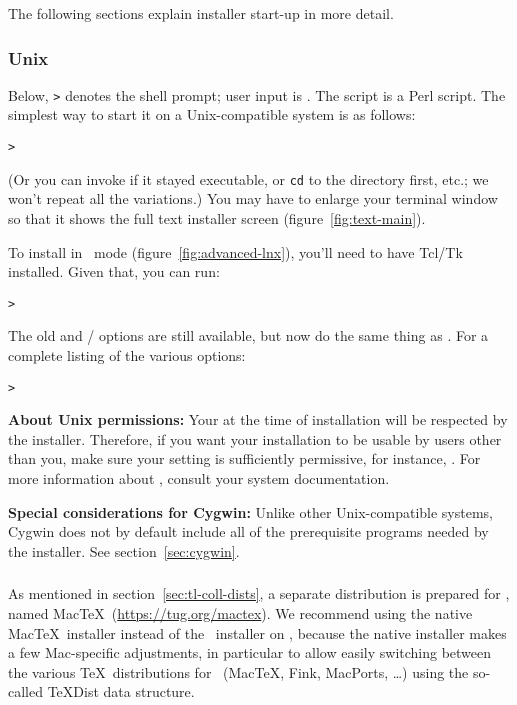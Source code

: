 \documentclass{article}
\begin{document}
The following sections explain installer start-up in more detail.

\subsubsection{Unix}

Below, \texttt{>} denotes the shell prompt; user input is
.
The script  is a Perl script.  The simplest way
to start it on a Unix-compatible system is as follows:
\begin{alltt}
> 
\end{alltt}
(Or you can invoke  if it stayed
executable, or \texttt{cd} to the directory first, etc.; we won't repeat
all the variations.)  You may have to enlarge your terminal window so
that it shows the full text installer screen
(figure~\ref{fig:text-main}).

To install in \GUI\ mode (figure~\ref{fig:advanced-lnx}), you'll need to
have Tcl/Tk installed.  Given that, you can run:
\begin{alltt}
> 
\end{alltt}

The old  and / options are
still available, but now do the same thing as . For
a complete listing of the various options:
\begin{alltt}
> 
\end{alltt}

\textbf{About Unix permissions:} Your  at the time
of installation will be respected by the \TL{} installer.  Therefore, if
you want your installation to be usable by users other than you, make
sure your setting is sufficiently permissive, for instance, .  For more information about , consult your system
documentation.

\textbf{Special considerations for Cygwin:} Unlike other
Unix-compatible systems, Cygwin does not by default include all of the
prerequisite programs needed by the \TL{} installer.  See
section~\ref{sec:cygwin}.


\subsubsection{\MacOSX}
\label{sec:macosx}

As mentioned in section~\ref{sec:tl-coll-dists}, a separate distribution
is prepared for \MacOSX, named Mac\TeX\ (\url{https://tug.org/mactex}).
We recommend using the native Mac\TeX\ installer instead of the \TL\
installer on \MacOSX, because the native installer makes a few
Mac-specific adjustments, in particular to allow easily switching
between the various \TeX\ distributions for \MacOSX\ (Mac\TeX, Fink,
MacPorts, \ldots) using the so-called \TeX{}Dist data structure.
\end{document}
